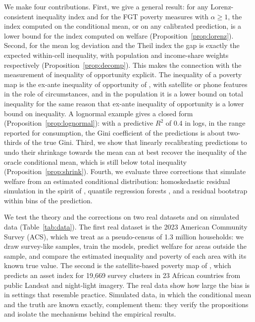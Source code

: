 \documentclass[pdflatex,sn-mathphys-ay]{sn-jnl}
\theoremstyle{thmstyleone}%
\theoremstyle{thmstyletwo}%
\theoremstyle{thmstylethree}%
\begin{document}
We make four contributions. First, we give a general result: for any Lorenz-consistent inequality index and for the FGT poverty measures with $\alpha \geq 1$, the index computed on the conditional mean, or on any calibrated prediction, is a lower bound for the index computed on welfare (Proposition~\ref{prop:lorenz}). Second, for the mean log deviation and the Theil index the gap is exactly the expected within-cell inequality, with population and income-share weights respectively (Proposition~\ref{prop:decomp}). This makes the connection with the measurement of inequality of opportunity explicit. The inequality of a poverty map is the ex-ante inequality of opportunity of \citet{ferreira2011}, with satellite or phone features in the role of circumstances, and in the population it is a lower bound on total inequality for the same reason that ex-ante inequality of opportunity is a lower bound on inequality. A lognormal example gives a closed form (Proposition~\ref{prop:lognormal}): with a predictive $R^2$ of 0.4 in logs, in the range reported for consumption, the Gini coefficient of the predictions is about two-thirds of the true Gini. Third, we show that linearly recalibrating predictions to undo their shrinkage towards the mean can at best recover the inequality of the oracle conditional mean, which is still below total inequality (Proposition~\ref{prop:shrink}). Fourth, we evaluate three corrections that simulate welfare from an estimated conditional distribution: homoskedastic residual simulation in the spirit of \citet{ell2003}, quantile regression forests \citep{meinshausen2006}, and a residual bootstrap within bins of the prediction.

We test the theory and the corrections on two real datasets and on simulated data (Table~\ref{tab:data}). The first real dataset is the 2023 American Community Survey (ACS), which we treat as a pseudo-census of 1.3 million households: we draw survey-like samples, train the models, predict welfare for areas outside the sample, and compare the estimated inequality and poverty of each area with its known true value. The second is the satellite-based poverty map of \citet{yeh2020}, which predicts an asset index for 19{,}669 survey clusters in 23 African countries from public Landsat and night-light imagery. The real data show how large the bias is in settings that resemble practice. Simulated data, in which the conditional mean and the truth are known exactly, complement them: they verify the propositions and isolate the mechanisms behind the empirical results.
\end{document}
